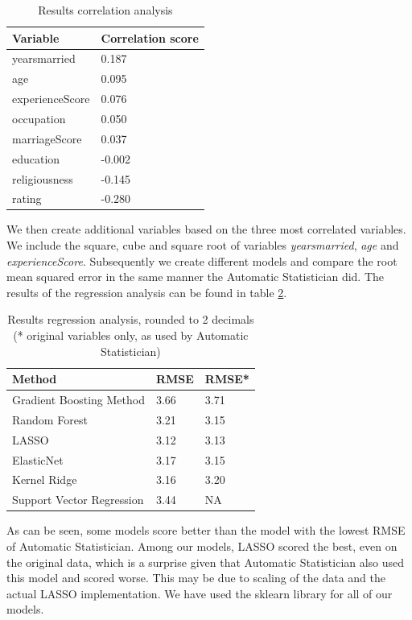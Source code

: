 \documentclass[a4paper, 10pt, conference]{ieeeconf}
\begin{document}
\begin{table}[!ht]
\centering
\begin{tabular}{| l | l |}
  \hline
  Variable & Correlation score \\
  \hline
  yearsmarried &      0.187 \\
  age &               0.095 \\
  experienceScore &   0.076 \\
  occupation &        0.050 \\
  marriageScore &     0.037 \\
  education &        -0.002 \\
  religiousness &    -0.145 \\
  rating &           -0.280 \\
  \hline
\end{tabular}
\caption{Results correlation analysis}
\label{table:correlation_affairs}
\end{table}

We then create additional variables based on the three most correlated variables. We include the square, cube and square root of variables \textit{yearsmarried}, \textit{age} and \textit{experienceScore}. Subsequently we create different models and compare the root mean squared error in the same manner the Automatic Statistician did. The results of the regression analysis can be found in table \ref{table:results_affairs}.

\begin{table}[!ht]
\centering
\begin{tabular}{| l | l | l |}
  \hline
  Method & RMSE & RMSE* \\
  \hline
  Gradient Boosting Method & 3.66 & 3.71 \\
  Random Forest & 3.21 & 3.15 \\
  LASSO & 3.12 & 3.13 \\
  ElasticNet & 3.17 & 3.15 \\
  Kernel Ridge & 3.16 & 3.20 \\
  Support Vector Regression & 3.44 & NA \\
  \hline
\end{tabular}
\caption{Results regression analysis, rounded to 2 decimals (* original variables only, as used by Automatic Statistician)}
\label{table:results_affairs}
\end{table}

As can be seen, some models score better than the model with the lowest RMSE of Automatic Statistician. Among our models, LASSO scored the best, even on the original data, which is a surprise given that Automatic Statistician also used this model and scored worse. This may be due to scaling of the data and the actual LASSO implementation. We have used the sklearn library \cite{scikit-learn} for all of our models. \\
\end{document}
